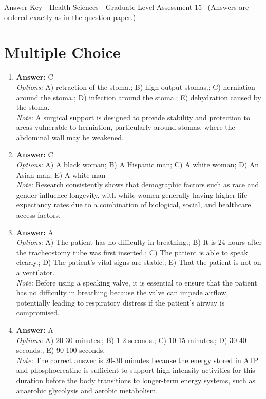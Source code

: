 \documentclass[12pt]{article}
\begin{document}
\begin{center}
Answer Key - Health Sciences - Graduate Level Assessment 15 \
\small (Answers are ordered exactly as in the question paper.)
\end{center}

\section*{Multiple Choice}
\begin{enumerate}[label=\arabic*.]
\item \textbf{Answer:} C
\\ \textit{Options:} A) retraction of the stoma.; B) high output stomas.; C) herniation around the stoma.; D) infection around the stoma.; E) dehydration caused by the stoma.
\\ \textit{Note:} A surgical support is designed to provide stability and protection to areas vulnerable to herniation, particularly around stomas, where the abdominal wall may be weakened.
\item \textbf{Answer:} C
\\ \textit{Options:} A) A black woman; B) A Hispanic man; C) A white woman; D) An Asian man; E) A white man
\\ \textit{Note:} Research consistently shows that demographic factors such as race and gender influence longevity, with white women generally having higher life expectancy rates due to a combination of biological, social, and healthcare access factors.
\item \textbf{Answer:} A
\\ \textit{Options:} A) The patient has no difficulty in breathing.; B) It is 24 hours after the tracheostomy tube was first inserted.; C) The patient is able to speak clearly.; D) The patient's vital signs are stable.; E) That the patient is not on a ventilator.
\\ \textit{Note:} Before using a speaking valve, it is essential to ensure that the patient has no difficulty in breathing because the valve can impede airflow, potentially leading to respiratory distress if the patient's airway is compromised.
\item \textbf{Answer:} A
\\ \textit{Options:} A) 20-30 minutes.; B) 1-2 seconds.; C) 10-15 minutes.; D) 30-40 seconds.; E) 90-100 seconds.
\\ \textit{Note:} The correct answer is 20-30 minutes because the energy stored in ATP and phosphocreatine is sufficient to support high-intensity activities for this duration before the body transitions to longer-term energy systems, such as anaerobic glycolysis and aerobic metabolism.

\end{enumerate}
\end{document}
